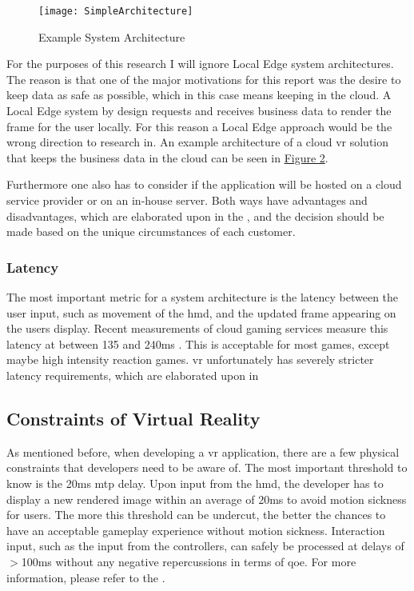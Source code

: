 \begin{figure}[!htbp]
\caption{Example System Architecture}
\label{fig:sysarch}
\texttt{[image: SimpleArchitecture]}
\end{figure}

For the purposes of this research I will ignore Local Edge system architectures. The reason is that one of the major motivations for this report was the desire to keep data as safe as possible, which in this case means keeping in the cloud. A Local Edge system by design requests and receives business data to render the frame for the user locally. For this reason a Local Edge approach would be the wrong direction to research in. An example architecture of a cloud \acrshort{vr} solution that keeps the business data in the cloud can be seen in \hyperref[fig:sysarch]{Figure 2}.

Furthermore one also has to consider if the application will be hosted on a cloud service provider or on an in-house server. Both ways have advantages and disadvantages, which are elaborated upon in the , and the decision should be made based on the unique circumstances of each customer.

\subsubsection{Latency}
The most important metric for a system architecture is the latency between the user input, such as movement of the \acrshort{hmd}, and the updated frame appearing on the users display. Recent measurements of cloud gaming services measure this latency at between 135 and 240\acrshort{ms} \parencite{lagmeasure}. This is acceptable for most games, except maybe high intensity reaction games. \acrshort{vr} unfortunately has severely stricter latency requirements, which are elaborated upon in 

\subsection{Constraints of Virtual Reality}
\label{ssec:vrphy}
As mentioned before, when developing a \acrshort{vr} application, there are a few physical constraints that developers need to be aware of. The most important threshold to know is the 20\acrshort{ms} \acrshort{mtp} delay. Upon input from the \acrshort{hmd}, the developer has to display a new rendered image within an average of 20\acrshort{ms} to avoid motion sickness for users. The more this threshold can be undercut, the better the chances to have an acceptable gameplay experience without motion sickness. Interaction input, such as the input from the controllers, can safely be processed at delays of $>$100\acrshort{ms} without any negative repercussions in terms of \acrfull{qoe}. For more information, please refer to the .


